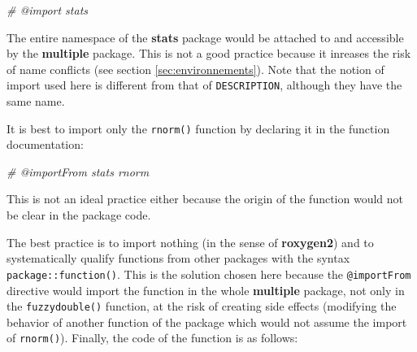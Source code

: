 \documentclass[
  12pt,
  american,
  a4paper,
  extrafontsizes,onecolumn,openright
  ]{memoir}
\newenvironment{Shaded}{\begin{snugshade}}{\end{snugshade}}
\newcommand{\CommentTok}[1]{\textcolor[rgb]{0.56,0.35,0.01}{\textit{#1}}}
\begin{document}
\scriptsize

\begin{Shaded}
\begin{Highlighting}[]
\CommentTok{\#\textquotesingle{} @import stats}
\end{Highlighting}
\end{Shaded}

\normalsize

The entire namespace of the \textbf{stats} package would be attached to and accessible by the \textbf{multiple} package.
This is not a good practice because it inreases the risk of name conflicts (see section \ref{sec:environnements}).
Note that the notion of import used here is different from that of \texttt{DESCRIPTION}, although they have the same name.

It is best to import only the \texttt{rnorm()} function by declaring it in the function documentation:

\scriptsize

\begin{Shaded}
\begin{Highlighting}[]
\CommentTok{\#\textquotesingle{} @importFrom stats rnorm}
\end{Highlighting}
\end{Shaded}

\normalsize

This is not an ideal practice either because the origin of the function would not be clear in the package code.

The best practice is to import nothing (in the sense of \textbf{roxygen2}) and to systematically qualify functions from other packages with the syntax \texttt{package::function()}.
This is the solution chosen here because the \texttt{@importFrom} directive would import the function in the whole \textbf{multiple} package, not only in the \texttt{fuzzydouble()} function, at the risk of creating side effects (modifying the behavior of another function of the package which would not assume the import of \texttt{rnorm()}).
Finally, the code of the function is as follows:

\scriptsize
\end{document}
